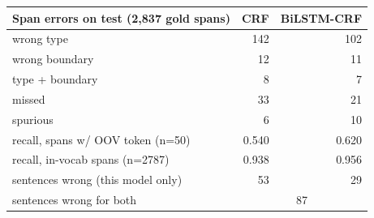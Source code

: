 \begin{tabular}{@{}lrr@{}}
\toprule
Span errors on test (2,837 gold spans) & CRF & BiLSTM-CRF \\
\midrule
wrong type & 142 & 102 \\
wrong boundary & 12 & 11 \\
type + boundary & 8 & 7 \\
missed & 33 & 21 \\
spurious & 6 & 10 \\
\midrule
recall, spans w/ OOV token (n=50) & 0.540 & 0.620 \\
recall, in-vocab spans (n=2787) & 0.938 & 0.956 \\
\midrule
sentences wrong (this model only) & 53 & 29 \\
sentences wrong for both & \multicolumn{2}{c}{87} \\
\bottomrule
\end{tabular}
